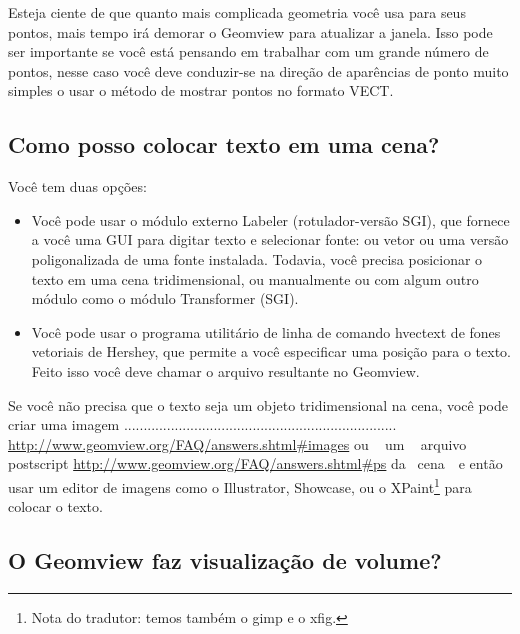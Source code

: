 \documentclass[12pt,a4paper]{article}
\begin{document}
        Esteja ciente de que quanto mais complicada geometria voc\^e usa para seus pontos,
        mais tempo ir\'a demorar o Geomview para atualizar a janela. Isso pode ser
        importante se voc\^e est\'a pensando em trabalhar com um grande n\'umero de pontos, nesse caso
        voc\^e deve conduzir-se na dire\c{c}\~ao de apar\^encias de ponto muito simples o usar o m\'etodo de
        mostrar pontos no formato VECT.

    \subsection{Como posso colocar texto em uma cena?}

        Voc\^e tem duas op\c{c}\~oes:
          \begin{itemize}
          \item Voc\^e pode usar o m\'{o}dulo externo Labeler (rotulador-vers\~ao SGI), que fornece a voc\^e uma GUI para
            digitar texto e selecionar fonte: ou vetor ou uma vers\~ao
            poligonalizada de uma fonte instalada. Todavia, voc\^e precisa posicionar o texto em uma cena
            tridimensional, ou manualmente ou com algum outro m\'{o}dulo como o m\'{o}dulo
            Transformer (SGI).
          \item Voc\^e pode usar o programa utilit\'ario de linha de comando hvectext de fones vetoriais de
            Hershey, que permite a voc\^e especificar uma posi\c{c}\~ao para o texto.
            Feito isso voc\^e deve chamar o arquivo resultante no Geomview.
          \end{itemize}
        Se voc\^e n\~ao precisa que o texto seja um objeto tridimensional na cena, voc\^e pode
        criar uma imagem ......................................................................
        \url{http://www.geomview.org/FAQ/answers.shtml#images} ou \,\,\,\,\,um \,\,\,\,\,arquivo\\ postscript
        \url{http://www.geomview.org/FAQ/answers.shtml#ps}
        da\,\,\, cena\,\,\,\, e ent\~ao usar um editor de imagens como o Illustrator,
        Showcase, ou o XPaint\footnote{Nota do tradutor: temos tamb\'em o gimp e o xfig.} para colocar o texto.

    \subsection{O Geomview faz visualiza\c{c}\~ao de volume?}
\end{document}
